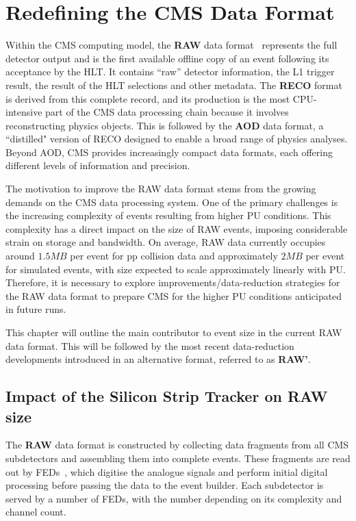 \chapter{Redefining the CMS Data Format}
\thispagestyle{plain}  %
\pagestyle{chapterpages}
\label{Section:Chapter5}
\minitoc

Within the \ac{CMS} computing model, the \textbf{RAW} data format~\cite{LHC_CMS} represents the full detector output and is the first available offline copy of an event following its acceptance by the \ac{HLT}. It contains ``raw'' detector information, the \ac{L1} trigger result, the result of the \ac{HLT} selections and other metadata. The \textbf{RECO} format is derived from this complete record, and its production is the most CPU-intensive part of the \ac{CMS} data processing chain because it involves reconstructing physics objects. This is followed by the \textbf{AOD} data format, a ``distilled" version of RECO designed to enable a broad range of physics analyses. Beyond AOD, \ac{CMS} provides increasingly compact data formats, each offering different levels of information and precision.

The motivation to improve the RAW data format stems from the growing demands on the \ac{CMS} data processing system. One of the primary challenges is the increasing complexity of events resulting from higher \ac{PU} conditions. This complexity has a direct impact on the size of RAW events, imposing considerable strain on storage and bandwidth.  On average, RAW data currently occupies around $1.5\unit{MB}$ per event for pp collision data and approximately $2\unit{MB}$ per event for simulated events, with size expected to scale approximately linearly with \ac{PU}. Therefore, it is necessary to explore improvements/data-reduction strategies for the RAW data format to prepare \ac{CMS} for the higher \ac{PU} conditions anticipated in future runs. 

This chapter will outline the main contributor to event size in the current RAW data format. This will be followed by the most recent data-reduction developments introduced in an alternative format, referred to as \textbf{RAW'}.

\section{Impact of the Silicon Strip Tracker on RAW size}
The \textbf{RAW} data format is constructed by collecting data fragments from all \ac{CMS} subdetectors and assembling them into complete events. These fragments are read out by \acp{FED}~\cite{LHC_CMS}, which digitise the analogue signals and perform initial digital processing before passing the data to the event builder. Each subdetector is served by a number of \acp{FED}, with the number depending on its complexity and channel count.

